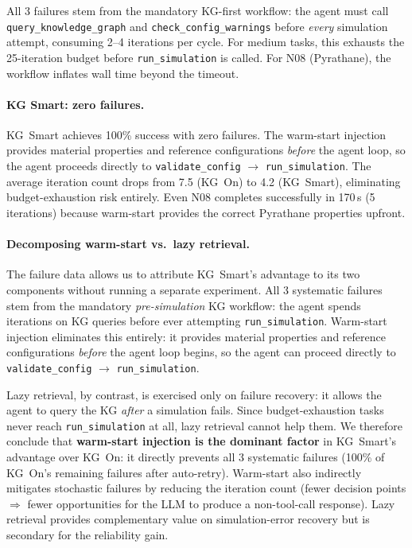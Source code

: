 \documentclass[preprint,review,12pt]{elsarticle}
\begin{document}
All 3 failures stem from the mandatory KG-first workflow: the agent
must call \texttt{query\_knowledge\_graph} and
\texttt{check\_config\_warnings} before \emph{every} simulation attempt,
consuming 2--4 iterations per cycle.  For medium tasks, this exhausts
the 25-iteration budget before \texttt{run\_simulation} is called.
For N08 (Pyrathane), the workflow inflates wall time beyond the timeout.

\paragraph{KG Smart: zero failures.}
KG~Smart achieves 100\% success with zero failures.  The warm-start
injection provides material properties and reference configurations
\emph{before} the agent loop, so the agent proceeds directly to
\texttt{validate\_config} $\to$ \texttt{run\_simulation}.  The average
iteration count drops from 7.5 (KG~On) to 4.2 (KG~Smart), eliminating
budget-exhaustion risk entirely.  Even N08 completes successfully in
170\,s (5 iterations) because warm-start provides the correct Pyrathane
properties upfront.

\paragraph{Decomposing warm-start vs.\ lazy retrieval.}
The failure data allows us to attribute KG~Smart's advantage to its
two components without running a separate experiment.  All 3 systematic
failures stem from the mandatory \emph{pre-simulation} KG workflow:
the agent spends iterations on KG queries before ever attempting
\texttt{run\_simulation}.  Warm-start injection eliminates this
entirely: it provides material properties and reference configurations
\emph{before} the agent loop begins, so the agent can proceed directly
to \texttt{validate\_config} $\to$ \texttt{run\_simulation}.

Lazy retrieval, by contrast, is exercised only on failure recovery:
it allows the agent to query the KG \emph{after} a simulation fails.
Since budget-exhaustion tasks never reach \texttt{run\_simulation}
at all, lazy retrieval cannot help them.  We therefore conclude
that \textbf{warm-start injection is the dominant factor} in
KG~Smart's advantage over KG~On: it directly prevents all 3 systematic
failures (100\% of KG~On's remaining failures after auto-retry).
Warm-start also indirectly mitigates stochastic failures by reducing
the iteration count (fewer decision points $\Rightarrow$ fewer
opportunities for the LLM to produce a non-tool-call response).
Lazy retrieval provides complementary value on simulation-error
recovery but is secondary for the reliability gain.
\end{document}
